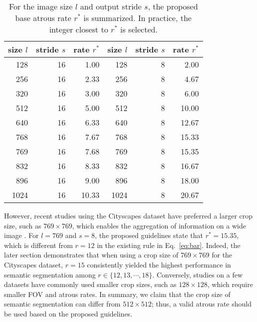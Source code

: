 \documentclass{article}
\def\eqref#1{Eq.~\ref{#1}}
\begin{document}
\begin{table}[t!]
	\caption{For the image size $l$ and output stride $s$, the proposed base atrous rate $r^*$ is summarized. In practice, the integer closest to $r^*$ is selected.}
	\label{tab:guide}
	\centering
	\begin{tabular}{rrr|rrr}
		\toprule
		size $l$ & stride $s$ & rate $r^*$ & size $l$ & stride $s$ & rate $r^*$ \\
		\midrule
		128      & 16         & 1.00       & 128      & 8          & 2.00       \\
		256      & 16         & 2.33       & 256      & 8          & 4.67       \\
		320      & 16         & 3.00       & 320      & 8          & 6.00       \\
		512      & 16         & 5.00       & 512      & 8          & 10.00      \\
		640      & 16         & 6.33       & 640      & 8          & 12.67      \\
		768      & 16         & 7.67       & 768      & 8          & 15.33      \\
		769      & 16         & 7.68       & 769      & 8          & 15.35      \\
		832      & 16         & 8.33       & 832      & 8          & 16.67      \\
		896      & 16         & 9.00       & 896      & 8          & 18.00      \\
		1024     & 16         & 10.33      & 1024     & 8          & 20.67      \\
		\bottomrule
	\end{tabular}
\end{table}

However, recent studies using the Cityscapes dataset have preferred a larger crop size, such as $769 \times 769$, which enables the aggregation of information on a wide image \citep{DBLP:conf/eccv/YinYCLZLH20,DBLP:journals/pami/HuangWWHSLH23,DBLP:journals/corr/abs-1907-12273,DBLP:conf/iccv/ZhuXBHB19}. For $l=769$ and $s=8$, the proposed guidelines state that $r^*=15.35$, which is different from $r=12$ in the existing rule in \eqref{eq:bar}. Indeed, the later section demonstrates that when using a crop size of $769 \times 769$ for the Cityscapes dataset, $r=15$ consistently yielded the highest performance in semantic segmentation among $r \in \{12, 13, \cdots, 18\}$. Conversely, studies on a few datasets have commonly used smaller crop sizes, such as $128 \times 128$, which require smaller FOV and atrous rates. In summary, we claim that the crop size of semantic segmentation can differ from $512 \times 512$; thus, a valid atrous rate should be used based on the proposed guidelines.
\end{document}
